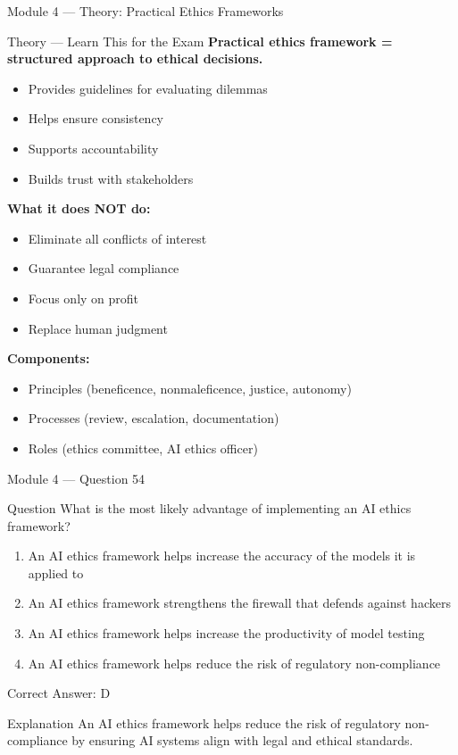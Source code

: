 \documentclass[aspectratio=169,10pt]{beamer}
\newcommand{\question}[1]{%
	\begin{block}{Question}
		#1
	\end{block}
}
\newcommand{\options}[4]{%
	\begin{enumerate}[label=\Alph*.,leftmargin=*]
		\item #1
		\item #2
		\item #3
		\item #4
	\end{enumerate}
}
\newcommand{\answerbox}[1]{%
	\begin{exampleblock}{Correct Answer: #1}
	\end{exampleblock}
}
\newcommand{\explain}[1]{%
	\begin{block}{Explanation}
		\small #1
	\end{block}
}
\newcommand{\theory}[1]{%
	\begin{block}{Theory --- Learn This for the Exam}
		\small #1
	\end{block}
}
\begin{document}
	\begin{frame}{Module 4 --- Theory: Practical Ethics Frameworks}
		\theory{
			\textbf{Practical ethics framework = structured approach to ethical decisions.}
			\begin{itemize}
				\item Provides guidelines for evaluating dilemmas
				\item Helps ensure consistency
				\item Supports accountability
				\item Builds trust with stakeholders
			\end{itemize}
			\textbf{What it does NOT do:}
			\begin{itemize}
				\item Eliminate all conflicts of interest
				\item Guarantee legal compliance
				\item Focus only on profit
				\item Replace human judgment
			\end{itemize}
			\textbf{Components:}
			\begin{itemize}
				\item Principles (beneficence, nonmaleficence, justice, autonomy)
				\item Processes (review, escalation, documentation)
				\item Roles (ethics committee, AI ethics officer)
			\end{itemize}
		}
	\end{frame}
	
	\begin{frame}{Module 4 --- Question 54}
		\question{What is the most likely advantage of implementing an AI ethics framework?}
		\options{An AI ethics framework helps increase the accuracy of the models it is applied to}{An AI ethics framework strengthens the firewall that defends against hackers}{An AI ethics framework helps increase the productivity of model testing}{An AI ethics framework helps reduce the risk of regulatory non-compliance}
		\answerbox{D}
		\explain{An AI ethics framework helps reduce the risk of regulatory non-compliance by ensuring AI systems align with legal and ethical standards.}
	\end{frame}
	
\end{document}
